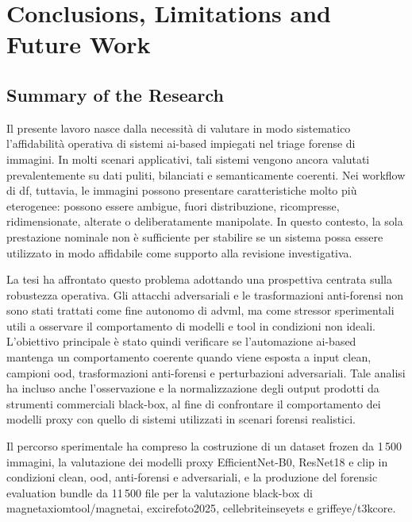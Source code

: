 \chapter{Conclusions, Limitations and Future Work}
\label{chap:conclusions}

\section{Summary of the Research}
\label{sec:conclusions-summary}

Il presente lavoro nasce dalla necessità di valutare in modo sistematico
l'affidabilità operativa di sistemi \gls{ai}-based impiegati nel triage forense
di immagini. In molti scenari applicativi, tali sistemi vengono ancora valutati
prevalentemente su dati puliti, bilanciati e semanticamente coerenti. Nei workflow
di \gls{df}, tuttavia, le immagini possono presentare caratteristiche molto più
eterogenee: possono essere ambigue, fuori distribuzione, ricompresse,
ridimensionate, alterate o deliberatamente manipolate. In questo contesto, la
sola prestazione nominale non è sufficiente per stabilire se un sistema possa
essere utilizzato in modo affidabile come supporto alla revisione investigativa.

La tesi ha affrontato questo problema adottando una prospettiva centrata sulla
robustezza operativa. Gli attacchi adversariali e le trasformazioni anti-forensi
non sono stati trattati come fine autonomo di \gls{advml}, ma come stressor
sperimentali utili a osservare il comportamento di modelli e tool in condizioni
non ideali. L'obiettivo principale è stato quindi verificare se l'automazione
\gls{ai}-based mantenga un comportamento coerente quando viene esposta a input
clean, campioni \gls{ood}, trasformazioni anti-forensi e perturbazioni
adversariali. Tale analisi ha incluso anche l'osservazione e la normalizzazione
degli output prodotti da strumenti commerciali black-box, al fine di confrontare
il comportamento dei modelli proxy con quello di sistemi utilizzati in scenari
forensi realistici.

Il percorso sperimentale ha compreso la costruzione di un dataset frozen da
1\,500 immagini, la valutazione dei modelli proxy EfficientNet-B0, ResNet18 e
\gls{clip} in condizioni clean, \gls{ood}, anti-forensi e adversariali, e la
produzione del forensic evaluation bundle da 11\,500 file per la valutazione
black-box di \gls{magnetaxiomtool}/\gls{magnetai}, \gls{excirefoto2025},
\gls{cellebriteinseyets} e \gls{griffeye}/\gls{t3kcore}.

